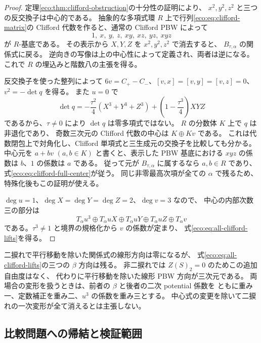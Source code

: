 \begin{proof}
定理\ref{eco:thm:clifford-obstruction}の十分性の証明により、
$x^2,y^2,z^2$ と三つの反交換子は中心的である。
抽象的な多項式環 $R$ 上で行列\eqref{eco:eq:clifford-matrix}の
Clifford 代数を作ると、通常の Clifford PBW によって
\[
 1,\ x,\ y,\ z,\ xy,\ xz,\ yz,\ xyz
\]
が $R$-基底である。
その表示から $X,Y,Z$ を $x^2,y^2,z^2$ で消去すると、
$B_{\tau,\alpha}$ の関係式に戻る。
逆向きの写像は上の中心性によって定義され、両者は逆になる。
これで $R$ の埋込みと階数八の主張を得る。

反交換子を使った整列によって
$6v=C_+-C_-$、$[v,x]=[v,y]=[v,z]=0$、$v^2=-\det q$ を得る。
また $u=0$ で
\[
 \det q=-\frac{\tau^2}{4}(X^3+Y^3+Z^3)
              +\left(1-\frac{\tau^3}{4}\right)XYZ
\]
であるから、$\tau\ne0$ により $\det q$ は零多項式ではない。
$R$ の分数体 $K$ 上で $q$ は非退化であり、
奇数三次元の Clifford 代数の中心は $K\oplus Kv$ である。
これは代数閉包上で対角化し、Clifford 単項式と三生成元の交換子を比較しても分かる。
中心元を $a+bv$ $(a,b\in K)$ と書くと、表示した PBW 基底における
$xyz$ の係数は $b$、$1$ の係数は $a$ である。
従って元が $B_{\tau,\alpha}$ に属するなら $a,b\in R$ であり、
式\eqref{eco:eq:clifford-full-center}が従う。
同じ非零最高次項が全ての $\alpha$ で残るため、特殊化後もこの証明が使える。

$\deg u=1$、$\deg X=\deg Y=\deg Z=2$、$\deg v=3$ なので、
中心の内部次数三の部分は
\[
 T_\alpha u^3\oplus T_\alpha uX\oplus T_\alpha uY
                 \oplus T_\alpha uZ\oplus T_\alpha v
\]
である。$\tau^3\ne1$ と境界の規格化から $v$ の係数が定まり、
式\eqref{eco:eq:all-clifford-lifts}を得る。
\end{proof}

\begin{remark}[関係式と中心式の一次方向]
\label{eco:rem:two-first-order-sources}
二捩れで平行移動を除いた関係式の線形方向は零になるが、
式\eqref{eco:eq:all-clifford-lifts}の三つの $\beta$ 方向は残る。
非二捩れでは $Z(S)_2=0$ のためこの追加自由度はなく、
代わりに平行移動を除いた線形 PBW 方向が三次元である。
両場合の変形を扱うときは、前者の $\beta$ と後者の二次 potential 係数を
ともに重み一、定数補正を重み二、$u^3$ の係数を重み三とする。
中心式の変更を除いて二捩れの一次変形が全て消えるとは主張しない。
\end{remark}

\subsection{比較問題への帰結と検証範囲}

